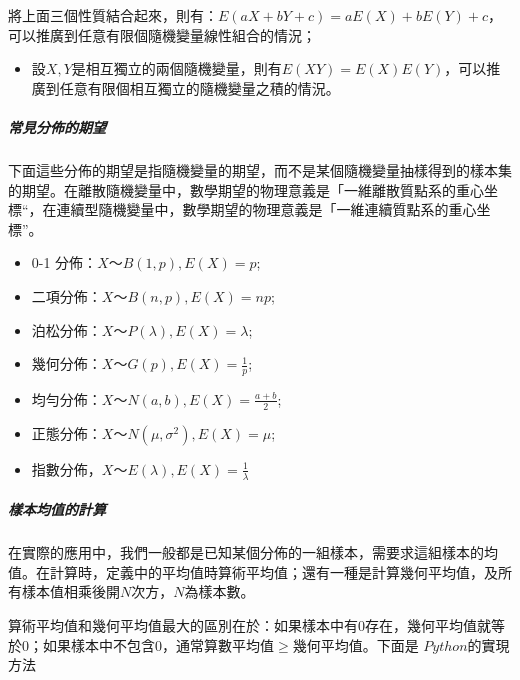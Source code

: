 \documentclass[11pt]{article}
\providecommand{\tightlist}{%
      \setlength{\itemsep}{0pt}\setlength{\parskip}{0pt}}
\begin{document}
將上面三個性質結合起來，則有：\(E(aX + bY + c) = aE(X) + bE(Y) + c\)，可以推廣到任意有限個隨機變量線性組合的情況；

\begin{itemize}
\tightlist
\item
  設\(X,Y\)是相互獨立的兩個隨機變量，則有\(E(XY) = E(X)E(Y)\)，可以推廣到任意有限個相互獨立的隨機變量之積的情況。
\end{itemize}

    \hypertarget{ux5e38ux898bux5206ux4f48ux7684ux671fux671b}{%
\subparagraph{常見分佈的期望}\label{ux5e38ux898bux5206ux4f48ux7684ux671fux671b}}

下面這些分佈的期望是指隨機變量的期望，而不是某個隨機變量抽樣得到的樣本集的期望。在離散隨機變量中，數學期望的物理意義是「一維離散質點系的重心坐標``，在連續型隨機變量中，數學期望的物理意義是「一維連續質點系的重心坐標''。

\begin{itemize}
\tightlist
\item
  0-1 分佈：\(X～B(1,p), E(X) = p\);
\item
  二項分佈：\(X～B(n,p), E(X) = np\);
\item
  泊松分佈：\(X～P(\lambda), E(X) = \lambda\);
\item
  幾何分佈：\(X～G(p), E(X) = \frac{1}{p}\);
\item
  均勻分佈：\(X～N(a, b), E(X) = \frac{a+b}{2}\);
\item
  正態分佈：\(X～N(\mu, \sigma^2), E(X) = \mu\);
\item
  指數分佈，\(X～E(\lambda), E(X) = \frac{1}{\lambda}\)
\end{itemize}

    \hypertarget{ux6a23ux672cux5747ux503cux7684ux8a08ux7b97}{%
\subparagraph{樣本均值的計算}\label{ux6a23ux672cux5747ux503cux7684ux8a08ux7b97}}

在實際的應用中，我們一般都是已知某個分佈的一組樣本，需要求這組樣本的均值。在計算時，定義中的平均值時算術平均值；還有一種是計算幾何平均值，及所有樣本值相乘後開\(N\)次方，\(N\)為樣本數。

算術平均值和幾何平均值最大的區別在於：如果樣本中有\(0\)存在，幾何平均值就等於\(0\)；如果樣本中不包含\(0\)，通常算數平均值\(\geq\)幾何平均值。下面是
\(Python\)的實現方法
\end{document}
